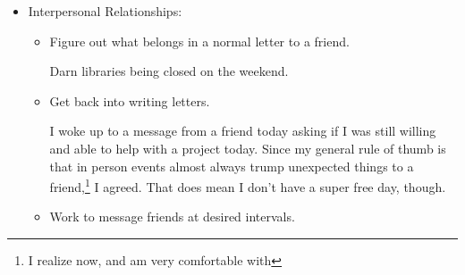 \documentclass[12pt]{article}[titlepage]
\renewcommand{\,}{\textsuperscript{,}}
\begin{document}
\begin{itemize}
\begin{itemize}
\item Interpersonal Relationships:  
\begin{itemize}   
\item Figure out what belongs in a normal letter to a friend.

Darn libraries being closed on the weekend.  
\item Get back into writing letters.

I woke up to a message from a friend today asking if I was still willing and able to help with a project today.  
Since my general rule of thumb is that in person events almost always trump unexpected things to a friend,\footnote{I realize now, and am very comfortable with} I agreed.  
That does mean I don't have a super free day, though.  
\item Work to message friends at desired intervals.  
\end{itemize}


\end{itemize}
\end{itemize}
\end{document}
